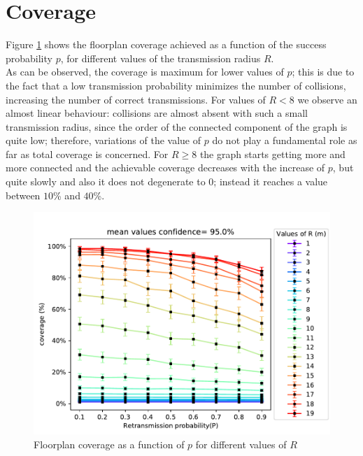 \section{Coverage}\label{ssec:coverage}
Figure \ref{fig:coveragePR} shows the floorplan coverage achieved as a
function of the success probability $p$, for different values of
the transmission radius $R$. \\
As can be observed, the coverage is maximum
for lower values of $p$; this is due to the fact that a low transmission
probability minimizes the number of collisions, increasing the number of correct
transmissions. For values of $R < 8$ we observe an almost linear behaviour:
collisions are almost absent with such a small transmission radius, since the order of the connected component of the graph is quite low; therefore,
variations of the value of $p$ do not play a fundamental role as far as total coverage is
concerned. For $R \geq 8$ the graph starts getting more and more connected and the achievable coverage
decreases with the increase of $p$, but quite slowly and also it does not
degenerate to $0$; instead it reaches a value between $10$\% and $40$\%.
\begin{figure}[H]
    \begin{center}
        \includegraphics[scale=.62,trim={0 0 0 0.8cm},clip]{img/big_coverage_p_mean_95.0.pdf}
    \end{center}
    \vspace*{-0.5cm}
    \caption{Floorplan coverage as a function of $p$ for different values of $R$}
    \label{fig:coveragePR}
\end{figure}
\noindent
